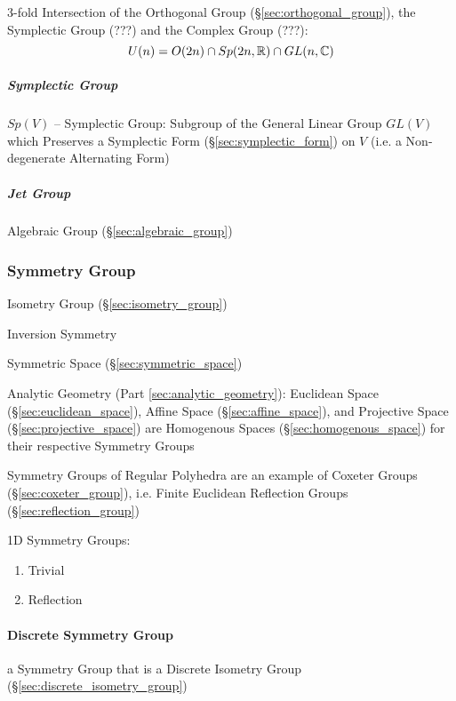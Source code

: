 3-fold Intersection of the Orthogonal Group (\S\ref{sec:orthogonal_group}), the
Symplectic Group (???) and the Complex Group (???): %
\[
  U(n) = O(2n) \cap Sp(2n,\mathbb{R}) \cap GL(n,\mathbb{C})
\]



\subparagraph{Symplectic Group}\label{sec:symplectic_group}\hfill

$Sp(V)$ -- Symplectic Group: Subgroup of the General Linear Group $GL(V)$ which
Preserves a Symplectic Form (\S\ref{sec:symplectic_form}) on $V$ (i.e. a
Non-degenerate Alternating Form)



\subparagraph{Jet Group}\label{sec:jet_group}\hfill

Algebraic Group (\S\ref{sec:algebraic_group})



\subsubsection{Symmetry Group}\label{sec:symmetry_group}

Isometry Group (\S\ref{sec:isometry_group})

Inversion Symmetry %

\fist Symmetric Space (\S\ref{sec:symmetric_space})

Analytic Geometry (Part \ref{sec:analytic_geometry}): Euclidean Space
(\S\ref{sec:euclidean_space}), Affine Space (\S\ref{sec:affine_space}), and
Projective Space (\S\ref{sec:projective_space}) are Homogenous Spaces
(\S\ref{sec:homogenous_space}) for their respective Symmetry Groups

Symmetry Groups of Regular Polyhedra are an example of Coxeter Groups
(\S\ref{sec:coxeter_group}), i.e. Finite Euclidean Reflection Groups
(\S\ref{sec:reflection_group})

1D Symmetry Groups: %
\begin{enumerate}
  \item Trivial
  \item Reflection
\end{enumerate}



\paragraph{Discrete Symmetry Group}\label{sec:discrete_symmetry_group}\hfill

a Symmetry Group that is a Discrete Isometry Group
(\S\ref{sec:discrete_isometry_group})



